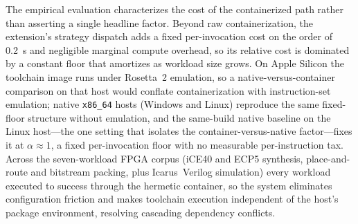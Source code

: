 The empirical evaluation characterizes the cost of the containerized path rather than asserting a single headline factor. Beyond raw containerization, the extension's strategy dispatch adds a fixed per-invocation cost on the order of \SI{0.2}{\second} and negligible marginal compute overhead, so its relative cost is dominated by a constant floor that amortizes as workload size grows. On Apple Silicon the toolchain image runs under Rosetta~2 emulation, so a native-versus-container comparison on that host would conflate containerization with instruction-set emulation; native \texttt{x86\_64} hosts (Windows and Linux) reproduce the same fixed-floor structure without emulation, and the same-build native baseline on the Linux host---the one setting that isolates the container-versus-native factor---fixes it at $\alpha \approx 1$, a fixed per-invocation floor with no measurable per-instruction tax. Across the seven-workload FPGA corpus (iCE40 and ECP5 synthesis, place-and-route and bitstream packing, plus Icarus~Verilog simulation) every workload executed to success through the hermetic container, so the system eliminates configuration friction and makes toolchain execution independent of the host's package environment, resolving cascading dependency conflicts.
